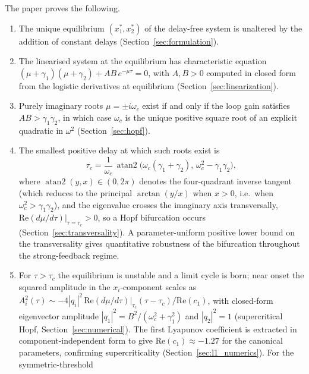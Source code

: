 \documentclass[sn-mathphys,Numbered]{sn-jnl}
\theoremstyle{thmstyleone}
\theoremstyle{thmstyletwo}
\theoremstyle{thmstylethree}
\begin{document}
The paper proves the following.
\begin{enumerate}
  \item The unique equilibrium $(x_1^*,x_2^*)$ of the delay-free system is
        unaltered by the addition of constant delays
        (Section~\ref{sec:formulation}).
  \item The linearised system at the equilibrium has characteristic equation
        $(\mu+\gamma_1)(\mu+\gamma_2) + AB\,e^{-\mu\tau} = 0$, with $A,B>0$
        computed in closed form from the logistic derivatives at equilibrium
        (Section~\ref{sec:linearization}).
  \item Purely imaginary roots $\mu=\pm i\omega_c$ exist if and only if the
        loop gain satisfies $AB>\gamma_1\gamma_2$, in which case
        $\omega_c$ is the unique positive square root of an explicit
        quadratic in $\omega^2$
        (Section~\ref{sec:hopf}).
  \item The smallest positive delay at which such roots exist is
        \[
          \tau_c
          = \frac{1}{\omega_c}\,
            \operatorname{atan2}\!\bigl(\omega_c(\gamma_1+\gamma_2),\,
                                         \omega_c^2-\gamma_1\gamma_2\bigr),
        \]
        where $\operatorname{atan2}(y,x)\in(0,2\pi)$ denotes the
        four-quadrant inverse tangent (which reduces to the principal
        $\arctan(y/x)$ when $x>0$, i.e.\ when $\omega_c^2>\gamma_1\gamma_2$),
        and the eigenvalue crosses the imaginary axis transversally,
        $\mathrm{Re}(d\mu/d\tau)|_{\tau=\tau_c}>0$, so a Hopf bifurcation
        occurs (Section~\ref{sec:transversality}). A
        parameter-uniform positive lower bound on the transversality
        gives quantitative robustness of the bifurcation throughout the
        strong-feedback regime.
  \item For $\tau>\tau_c$ the equilibrium is unstable and a limit cycle
        is born; near onset the squared amplitude in the $x_i$-component
        scales as
        $A_i^{2}(\tau)\sim
        -4|q_i|^{2}\,\mathrm{Re}(d\mu/d\tau)|_{\tau_c}(\tau-\tau_c)/
        \mathrm{Re}(c_1)$, with closed-form eigenvector amplitude
        $|q_1|^{2}=B^{2}/(\omega_c^{2}+\gamma_1^{2})$ and $|q_2|^{2}=1$
        (supercritical Hopf, Section~\ref{sec:numerical}). The first
        Lyapunov coefficient is extracted in
        component-independent form to give
        $\mathrm{Re}(c_1)\approx -1.27$ for the canonical parameters,
        confirming supercriticality
        (Section~\ref{sec:l1_numerics}). For the symmetric-threshold

\end{enumerate}
\end{document}
